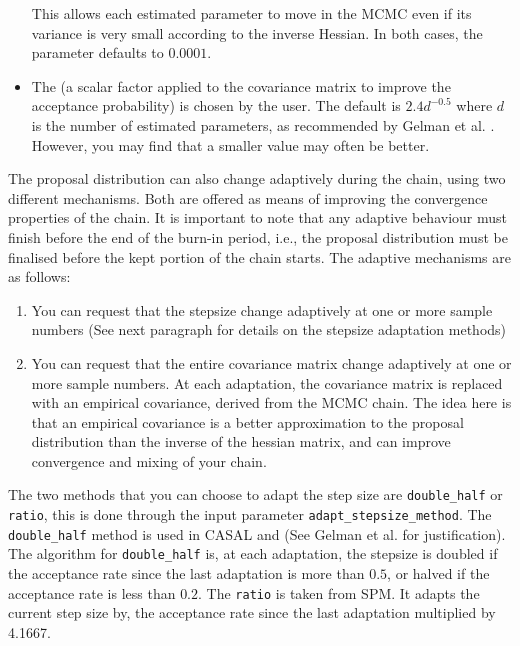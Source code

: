 \begin{itemize}
This allows each estimated parameter to move in the MCMC even if its variance is very small according to the inverse Hessian. In both cases, the  parameter defaults to $0.0001$.

\item The  (a scalar factor applied to the covariance matrix to improve the acceptance probability) is chosen by the user. The default is $2.4d^{-0.5}$ where $d$ is the number of estimated parameters, as recommended by Gelman et al. \citep{823}. However, you may find that a smaller value may often be better. 
\end{itemize}

The proposal distribution can also change adaptively during the chain, using two different mechanisms. Both are offered as means of improving the convergence properties of the chain. It is important to note that any adaptive behaviour must finish before the end of the burn-in period, i.e., the proposal distribution must be finalised before the kept portion of the chain starts. The adaptive mechanisms are as follows: 

\begin{enumerate}
\item You can request that the stepsize change adaptively at one or more sample numbers (See next paragraph for details on the stepsize adaptation methods)

\item You can request that the entire covariance matrix change adaptively at one or more sample numbers. At each adaptation, the covariance matrix is replaced with an empirical covariance, derived from the MCMC chain. The idea here is that an empirical covariance is a better approximation to the proposal distribution than the inverse of the hessian matrix, and can improve convergence and mixing of your chain.
\end{enumerate}

The two methods that you can choose to adapt the step size are \texttt{double\_half} or \texttt{ratio}, this is done through the input parameter \texttt{adapt\_stepsize\_method}. The \texttt{double\_half} method is used in CASAL and (See Gelman et al. \citep{823} for justification). The algorithm for \texttt{double\_half} is, at each adaptation, the stepsize is doubled if the acceptance rate since the last adaptation is more than $0.5$, or halved if the acceptance rate is less than $0.2$. The \texttt{ratio} is taken from SPM. It adapts the current step size by, the acceptance rate since the last adaptation multiplied by 4.1667.

